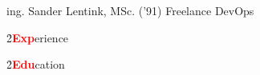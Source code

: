 \large ing.
\Huge Sander Lentink,
\large MSc. ('91) Freelance DevOps
\normalsize

\h{2}{\textbf{\textcolor{red}{Exp}}erience}{}


\h{2}{\textbf{\textcolor{red}{Edu}}cation}{}


